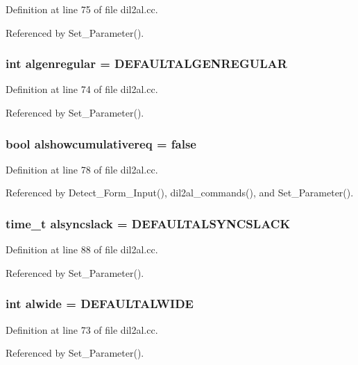 Definition at line 75 of file dil2al.cc.

Referenced by Set\_\-Parameter().
\subsubsection{\setlength{\rightskip}{0pt plus 5cm}int algenregular = DEFAULTALGENREGULAR}\label{dil2al_8cc_a56}




Definition at line 74 of file dil2al.cc.

Referenced by Set\_\-Parameter().
\subsubsection{\setlength{\rightskip}{0pt plus 5cm}bool alshowcumulativereq = {\bf false}}\label{dil2al_8cc_a60}




Definition at line 78 of file dil2al.cc.

Referenced by Detect\_\-Form\_\-Input(), dil2al\_\-commands(), and Set\_\-Parameter().
\subsubsection{\setlength{\rightskip}{0pt plus 5cm}time\_\-t alsyncslack = DEFAULTALSYNCSLACK}\label{dil2al_8cc_a70}




Definition at line 88 of file dil2al.cc.

Referenced by Set\_\-Parameter().
\subsubsection{\setlength{\rightskip}{0pt plus 5cm}int alwide = DEFAULTALWIDE}\label{dil2al_8cc_a55}




Definition at line 73 of file dil2al.cc.

Referenced by Set\_\-Parameter().
